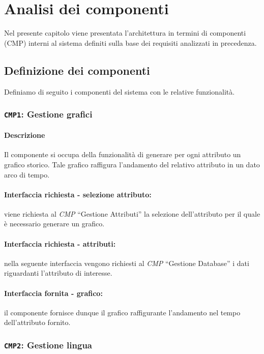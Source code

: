 \chapter{Analisi dei componenti}
    Nel presente capitolo viene presentata l'architettura in termini di componenti (CMP) interni al sistema definiti sulla base dei requisiti analizzati in precedenza.

\section{Definizione dei componenti}
    Definiamo di seguito i componenti del sistema con le relative funzionalità.
    
    \subsection{\texttt{CMP1}: Gestione grafici}
        \subsubsection{Descrizione} 
            Il componente si occupa della funzionalità di generare per ogni attributo un grafico storico. Tale grafico raffigura l'andamento del relativo attributo in un dato arco di tempo.
        \subsubsection{Interfaccia richiesta - selezione attributo:}
            viene richiesta al \textit{CMP} ``Gestione Attributi'' la selezione dell'attributo per il quale è necessario generare un grafico.
        \subsubsection{Interfaccia richiesta - attributi:}
            nella seguente interfaccia vengono richiesti al \textit{CMP} ``Gestione Database'' i dati riguardanti l'attributo di interesse.
        \subsubsection{Interfaccia fornita - grafico:}
            il componente fornisce dunque il grafico raffigurante l'andamento nel tempo dell'attributo fornito.
    
    \subsection{\texttt{CMP2}: Gestione lingua}
